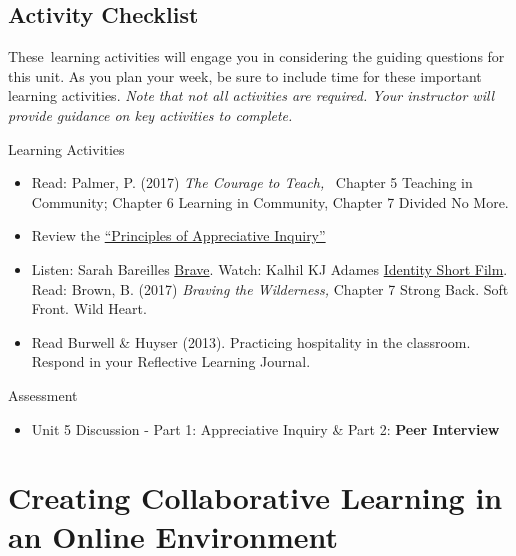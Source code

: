 \documentclass[
]{book}
\providecommand{\tightlist}{%
  \setlength{\itemsep}{0pt}\setlength{\parskip}{0pt}}
\begin{document}
\hypertarget{activity-checklist-4}{%
\subsection*{Activity Checklist}\label{activity-checklist-4}}

These~learning activities will engage you in considering the guiding questions for this unit. As you plan your week, be sure to include time for these important learning activities. \emph{Note that not all activities are required. Your instructor will provide guidance on key activities to complete.}

\begin{reflect}
{Learning Activities}

\begin{itemize}
\tightlist
\item
  Read: Palmer, P. (2017) \emph{The Courage to Teach,} ~Chapter 5
  Teaching in Community; Chapter 6 Learning in Community, Chapter 7
  Divided No More.\\
\item
  Review the
  \href{https://appreciativeinquiry.champlain.edu/learn/appreciative-inquiry-introduction/5-classic-principles-ai}{``Principles
  of Appreciative Inquiry''}\\
\item
  Listen: Sarah Bareilles
  \href{https://www.youtube.com/watch?v=QUQsqBqxoR4}{Brave}. Watch:
  Kalhil KJ Adames
  \href{https://www.youtube.com/watch?v=ikGVWEvUzNM}{Identity Short
  Film}. Read: Brown, B. (2017) \emph{Braving the Wilderness,} Chapter 7
  Strong Back. Soft Front. Wild Heart.\\
\item
  Read Burwell \& Huyser (2013). Practicing hospitality in the
  classroom. Respond in your Reflective Learning Journal.
\end{itemize}
\end{reflect}

\begin{assessment}
{Assessment}

\begin{itemize}
\tightlist
\item
  Unit 5 Discussion - Part 1: Appreciative Inquiry \& Part 2:
  \textbf{Peer Interview}
\end{itemize}
\end{assessment}

\hypertarget{creating-collaborative-learning-in-an-online-environment}{%
\section{Creating Collaborative Learning in an Online Environment}\label{creating-collaborative-learning-in-an-online-environment}}
\end{document}
